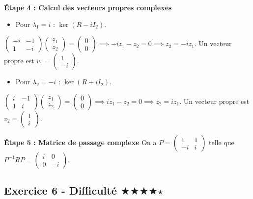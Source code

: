 \documentclass[11pt,a4paper]{article}
\begin{document}
\textbf{Étape 4 : Calcul des vecteurs propres complexes}
\begin{itemize}
\item Pour $\lambda_1 = i$ : $\ker(R - iI_2)$.
\end{itemize}
$\begin{pmatrix} -i & -1 \\ 1 & -i \end{pmatrix} \begin{pmatrix} z_1 \\ z_2 \end{pmatrix} = \begin{pmatrix} 0 \\ 0 \end{pmatrix} \implies -i z_1 - z_2 = 0 \implies z_2 = -i z_1$.
Un vecteur propre est $v_1 = \begin{pmatrix} 1 \\ -i \end{pmatrix}$.

\begin{itemize}
\item Pour $\lambda_2 = -i$ : $\ker(R + iI_2)$.
\end{itemize}
$\begin{pmatrix} i & -1 \\ 1 & i \end{pmatrix} \begin{pmatrix} z_1 \\ z_2 \end{pmatrix} = \begin{pmatrix} 0 \\ 0 \end{pmatrix} \implies i z_1 - z_2 = 0 \implies z_2 = i z_1$.
Un vecteur propre est $v_2 = \begin{pmatrix} 1 \\ i \end{pmatrix}$.

\textbf{Étape 5 : Matrice de passage complexe}
On a $P = \begin{pmatrix} 1 & 1 \\ -i & i \end{pmatrix}$ telle que $P^{-1} R P = \begin{pmatrix} i & 0 \\ 0 & -i \end{pmatrix}$.


\subsection*{Exercice 6 - Difficulté \quad $\bigstar$$\bigstar$$\bigstar$$\bigstar$$\star$}
\end{document}
